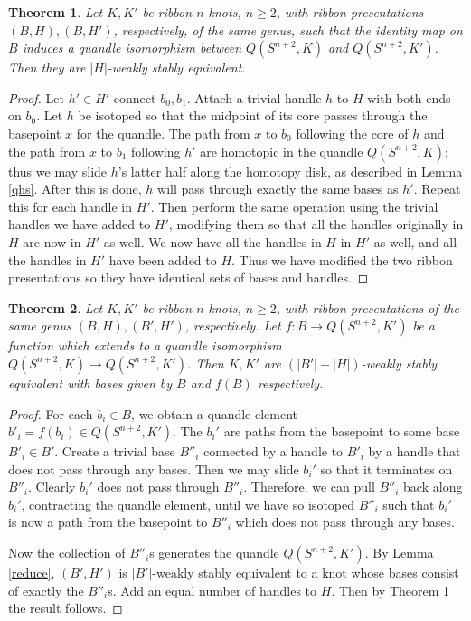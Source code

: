\documentclass{amsart}
\newtheorem{theorem}{Theorem}
\newcommand{\bpr}{\begin{proof}}
\newcommand{\epr}{\end{proof}}
\begin{document}
\begin{theorem}
Let $K, K'$ be ribbon $n$-knots, $n\geq 2$, with ribbon presentations $(B, H), (B, H')$, respectively, of the same genus, such that the identity map on $B$ induces a quandle isomorphism between $Q(S^{n+2}, K)$ and $Q(S^{n+2}, K')$. Then they are $|H|$-weakly stably equivalent. \label{isoeq}
\end{theorem}
\bpr Let $h'\in H'$ connect $b_0, b_1$. Attach a trivial handle $h$ to $H$ with both ends on $b_0$. Let $h$ be isotoped so that the midpoint of its core passes through the basepoint $x$ for the quandle. The path from $x$ to $b_0$ following the core of $h$ and the path from $x$ to $b_1$ following $h'$ are homotopic in the quandle $Q(S^{n+2}, K)$; thus we may slide $h$'s latter half along the homotopy disk, as described in Lemma \ref{qhs}. After this is done, $h$ will pass through exactly the same bases as $h'$. Repeat this for each handle in $H'$. Then perform the same operation using the trivial handles we have added to $H'$, modifying them so that all the handles originally in $H$ are now in $H'$ as well. We now have all the handles in $H$ in $H'$ as well, and all the handles in $H'$ have been added to $H$. Thus we have modified the two ribbon presentations so they have identical sets of bases and handles. \epr

\begin{theorem}
Let $K, K'$ be ribbon $n$-knots, $n\geq 2$, with ribbon presentations of the same genus $(B, H), (B', H')$, respectively. Let $f:B\rightarrow Q(S^{n+2}, K')$ be a function which extends to a quandle isomorphism $Q(S^{n+2}, K)\rightarrow Q(S^{n+2}, K')$. Then $K, K'$ are $(|B'|+|H|)$-weakly stably equivalent with bases given by $B$ and $f(B)$ respectively. \label{injeq}
\end{theorem}
\bpr For each $b_i\in B$, we obtain a quandle element $b'_i=f(b_i)\in Q(S^{n+2}, K')$. The $b_i'$ are paths from the basepoint to some base $B'_i \in B'$. Create a trivial base $B''_i$ connected by a handle to $B'_i$ by a handle that does not pass through any bases. Then we may slide $b_i'$ so that it terminates on $B''_i$. Clearly $b_i'$ does not pass through $B''_i$. Therefore, we can pull $B''_i$ back along $b_i'$, contracting the quandle element, until we have so isotoped $B''_i$ such that $b_i'$ is now a path from the basepoint to $B''_i$ which does not pass through any bases.

Now the collection of $B''_i$s generates the quandle $Q(S^{n+2}, K')$. By Lemma \ref{reduce}, $(B', H')$ is $|B'|$-weakly stably equivalent to a knot whose bases consist of exactly the $B''_i$s. Add an equal number of handles to $H$. Then by Theorem \ref{isoeq} the result follows. \epr
\end{document}
